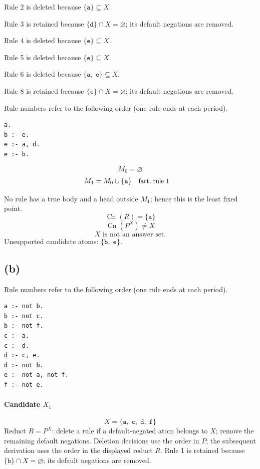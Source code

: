 \documentclass[a4paper,11pt]{article}
\newif\ifexplain
\newcommand{\explain}[1]{\ifexplain\begin{erklbox}#1\end{erklbox}\fi}
\newcommand{\why}[1]{\text{\small #1}}
\newcommand{\teil}[1]{\subsection*{(#1)}}
\newcommand{\at}[1]{\texttt{#1}}
\begin{document}
Rule 2 is deleted because $\{\at{a}\}\subseteq X$.

Rule 3 is retained because $\{\at{d}\}\cap X=\varnothing$; its default negations are removed.

Rule 4 is deleted because $\{\at{e}\}\subseteq X$.

Rule 5 is deleted because $\{\at{e}\}\subseteq X$.

Rule 6 is deleted because $\{\at{a},\;\at{e}\}\subseteq X$.

Rule 8 is retained because $\{\at{c}\}\cap X=\varnothing$; its default negations are removed.

Rule numbers refer to the following order (one rule ends at each period).
\begin{small}
\begin{verbatim}
a.
b :- e.
e :- a, d.
e :- b.
\end{verbatim}
\end{small}
\explain{Beim Redukt bleibt die Kandidatenmenge fest. Wir entscheiden zuerst, welche Regeln wegfallen. Erst danach berechnen wir aus den verbleibenden positiven Regeln die kleinste abgeschlossene Menge. Ein Modell allein reicht nicht: Diese Menge muss genau der Kandidat sein.}
\[
M_0=\varnothing
\]
\begin{align*}
M_{1} &= M_{0}\cup \{\at{a}\} && \why{fact, rule 1}
\end{align*}
\explain{Diese Regel hat keinen Körper. Ihr Kopf $\at{a}$ ist damit ein Fakt und muss in die Menge.}
No rule has a true body and a head outside $M_{1}$; hence this is the least fixed point.
\[
\operatorname{Cn}(R)=\{\at{a}\}
\]
\[
\operatorname{Cn}(P^X)\ne X
\]
\[
\boxed{X\text{ is not an answer set.}}
\]
Unsupported candidate atoms: $\{\at{b},\;\at{e}\}$.
\teil{b}
Rule numbers refer to the following order (one rule ends at each period).
\begin{small}
\begin{verbatim}
a :- not b.
b :- not c.
b :- not f.
c :- a.
c :- d.
d :- c, e.
d :- not b.
e :- not a, not f.
f :- not e.
\end{verbatim}
\end{small}
\paragraph{Candidate $X_1$}
\[
X=\{\at{a},\;\at{c},\;\at{d},\;\at{f}\}
\]
Reduct $R=P^X$: delete a rule if a default-negated atom belongs to $X$; remove the remaining default negations. Deletion decisions use the order in $P$; the subsequent derivation uses the order in the displayed reduct $R$.
Rule 1 is retained because $\{\at{b}\}\cap X=\varnothing$; its default negations are removed.
\end{document}
